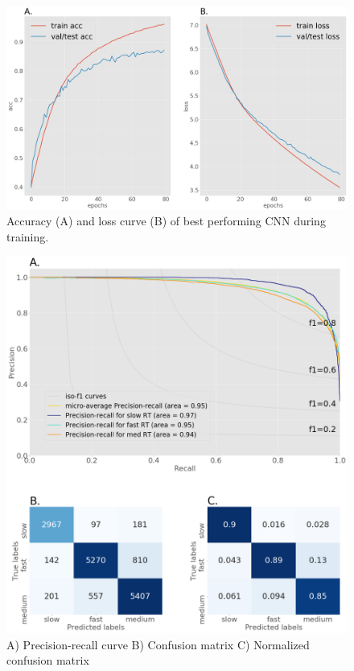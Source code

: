\documentclass{article}
\begin{document}
\begin{figure}[ht]
\vskip 0.2in
\begin{center}
\centerline{\includegraphics[width=\columnwidth]{Images/acc_loss_best_model}}
\caption[Accuracy and loss curve of the best model]{Accuracy (A) and loss curve (B) of best performing CNN during training.}
\end{center}
\vskip -0.2in
\label{acc_loss_best_model}
\end{figure}

\begin{figure}[ht]
\vskip 0.2in
\begin{center}
\centerline{\includegraphics[width=\columnwidth]{Images/best_pr_cfm}}
\caption[Accuracy and loss curve of the best model]{A) Precision-recall curve B) Confusion matrix C) Normalized confusion matrix}
\end{center}
\vskip -0.2in
\label{best_pr_cfm}
\end{figure}
\end{document}
